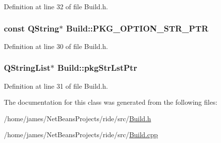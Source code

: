 Definition at line 32 of file Build.\-h.

\hypertarget{class_build_a32d97560bba88abe53398fdebcb4ddcf}{
\subsubsection[{P\-K\-G\-\_\-\-O\-P\-T\-I\-O\-N\-\_\-\-S\-T\-R\-\_\-\-P\-T\-R}]{\setlength{\rightskip}{0pt plus 5cm}const Q\-String$\ast$ Build\-::\-P\-K\-G\-\_\-\-O\-P\-T\-I\-O\-N\-\_\-\-S\-T\-R\-\_\-\-P\-T\-R\hspace{0.3cm}{\ttfamily [private]}}}\label{class_build_a32d97560bba88abe53398fdebcb4ddcf}


Definition at line 30 of file Build.\-h.

\hypertarget{class_build_af980a5b63ef5778e733cc4d29064be7e}{
\subsubsection[{pkg\-Str\-Lst\-Ptr}]{\setlength{\rightskip}{0pt plus 5cm}Q\-String\-List$\ast$ Build\-::pkg\-Str\-Lst\-Ptr\hspace{0.3cm}{\ttfamily [private]}}}\label{class_build_af980a5b63ef5778e733cc4d29064be7e}


Definition at line 31 of file Build.\-h.



The documentation for this class was generated from the following files\-:\begin{DoxyCompactItemize}
\item 
/home/james/\-Net\-Beans\-Projects/ride/src/\hyperlink{_build_8h}{Build.\-h}\item 
/home/james/\-Net\-Beans\-Projects/ride/src/\hyperlink{_build_8cpp}{Build.\-cpp}\end{DoxyCompactItemize}

